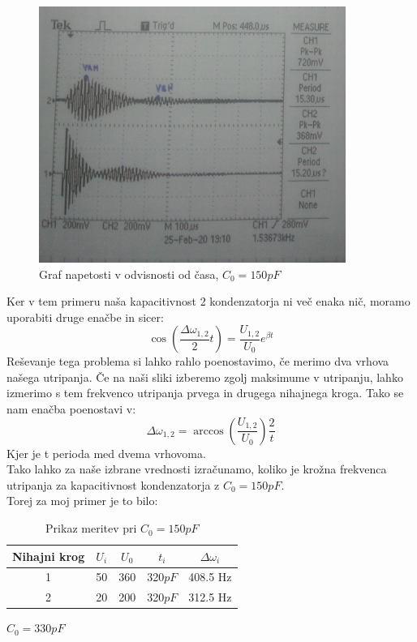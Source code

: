 \documentclass[11pt, a4paper]{article}
\theoremstyle{definition}
\theoremstyle{example}
\theoremstyle{izrek}
\begin{document}
\begin{figure}[htp]
    \centering
    \includegraphics[width=10cm]{C=150.jpg}
    \caption{Graf napetosti v odvisnosti od časa, $C_0=150 pF$}
\end{figure}
Ker v tem primeru naša kapacitivnost 2 kondenzatorja ni več enaka nič, moramo uporabiti druge enačbe in sicer: 
$$\cos\left(\frac{\Delta \omega_{1,2}}{2}t\right)=\frac{U_{1,2}}{U_0}e^{\beta t}$$
Reševanje tega problema si lahko rahlo poenostavimo, če merimo dva vrhova našega utripanja.
Če na naši sliki izberemo zgolj maksimume v utripanju, lahko izmerimo s tem frekvenco utripanja prvega in drugega nihajnega kroga.
Tako se nam enačba poenostavi v:
$$\Delta \omega_{1,2}=\arccos \left(\frac{U_{1,2}}{U_0}\right) \frac{2}{t} $$
Kjer je t perioda med dvema vrhovoma.\\
Tako lahko za naše izbrane vrednosti izračunamo, koliko je krožna frekvenca utripanja za kapacitivnost kondenzatorja z $C_0=150pF$.\\
Torej za moj primer je to bilo: \\

\begin{table}[ht]
	\centering
	\begin{tabular}{|c|c|c|c|c|}
		\hline
		Nihajni krog & $U_i$ & $U_0$ & $ t_i$ & $\Delta \omega_i$ \\
		\hline
		\hline
		1 & 50 & 360 & 320$pF$ & 408.5 Hz \\
		\hline
		2 & 20 & 200 & 320$pF$ & 312.5 Hz \\
		\hline
		\end{tabular}
		\caption{Prikaz meritev pri $C_0=150pF$}
		\label{tab:FirstTable}
\end{table}

\pagebreak
\textbf{\underline{$C_0=330pF$}}\\
\end{document}
